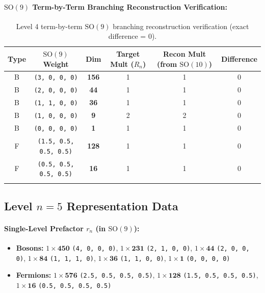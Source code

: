 \documentclass[11pt,a4paper]{article}
\begin{document}
\paragraph{$\mathrm{SO}(9)$ Term-by-Term Branching Reconstruction Verification:}
\begin{longtable}{@{}cccccc@{}}
\toprule
Type & $\mathrm{SO}(9)$ Weight & Dim & Target Mult ($R_n$) & Recon Mult (from $\mathrm{SO}(10)$) & Difference \\
\midrule
\endhead
B & \texttt{(3, 0, 0, 0)} & \textbf{156} & 1 & 1 & 0 \\
B & \texttt{(2, 0, 0, 0)} & \textbf{44} & 1 & 1 & 0 \\
B & \texttt{(1, 1, 0, 0)} & \textbf{36} & 1 & 1 & 0 \\
B & \texttt{(1, 0, 0, 0)} & \textbf{9} & 2 & 2 & 0 \\
B & \texttt{(0, 0, 0, 0)} & \textbf{1} & 1 & 1 & 0 \\
F & \texttt{(1.5, 0.5, 0.5, 0.5)} & \textbf{128} & 1 & 1 & 0 \\
F & \texttt{(0.5, 0.5, 0.5, 0.5)} & \textbf{16} & 1 & 1 & 0 \\
\bottomrule
\caption{Level 4 term-by-term $\mathrm{SO}(9)$ branching reconstruction verification (exact difference = 0).}
\end{longtable}

\subsection{Level $n = 5$ Representation Data}
\paragraph{Single-Level Prefactor $r_n$ (in $\mathrm{SO}(9)$):}
\begin{itemize}
    \item \textbf{Bosons:} $1 \times \mathbf{450}$ \texttt{(4, 0, 0, 0)}, $1 \times \mathbf{231}$ \texttt{(2, 1, 0, 0)}, $1 \times \mathbf{44}$ \texttt{(2, 0, 0, 0)}, $1 \times \mathbf{84}$ \texttt{(1, 1, 1, 0)}, $1 \times \mathbf{36}$ \texttt{(1, 1, 0, 0)}, $1 \times \mathbf{1}$ \texttt{(0, 0, 0, 0)}
    \item \textbf{Fermions:} $1 \times \mathbf{576}$ \texttt{(2.5, 0.5, 0.5, 0.5)}, $1 \times \mathbf{128}$ \texttt{(1.5, 0.5, 0.5, 0.5)}, $1 \times \mathbf{16}$ \texttt{(0.5, 0.5, 0.5, 0.5)}
\end{itemize}
\end{document}

